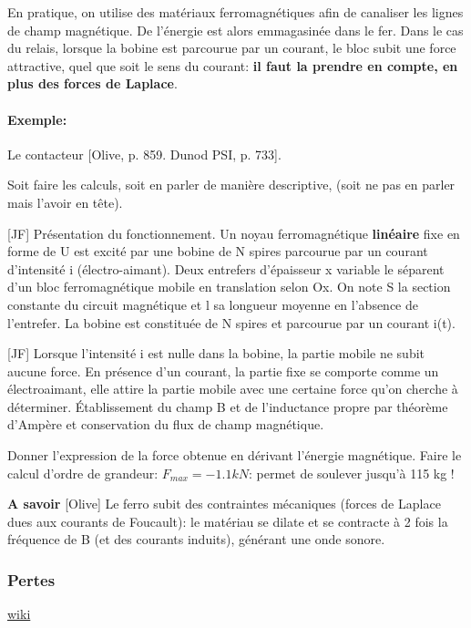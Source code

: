 \documentclass[11pt]{report}
\numberwithin{figure}{section}
\numberwithin{equation}{section}
\numberwithin{table}{section}
\newcommand{\1}{\boldsymbol{1}}
\begin{document}
En pratique, on utilise des matériaux ferromagnétiques afin de canaliser les lignes de champ magnétique. De l'énergie est alors emmagasinée dans le fer. Dans le cas du relais, lorsque la bobine est parcourue par un courant, le bloc subit une force attractive, quel que soit le sens du courant: \textbf{il faut la prendre en compte, en plus des forces de Laplace}.

\paragraph{Exemple:} Le contacteur [Olive, p. 859. Dunod PSI, p. 733].

Soit faire les calculs, soit en parler de manière descriptive, (soit ne pas en parler mais l'avoir en tête).

[JF] Présentation du fonctionnement. Un
noyau ferromagnétique \textbf{linéaire} fixe en forme de U est excité par une bobine de N spires parcourue par un courant d’intensité i (électro-aimant). Deux entrefers d’épaisseur x variable le séparent d’un bloc ferromagnétique mobile en translation
selon Ox. On note S la section constante du circuit magnétique et l sa longueur moyenne en l’absence de l’entrefer. La bobine est constituée de N spires et parcourue par un courant i(t).

[JF] Lorsque l’intensité i est nulle dans la bobine, la partie mobile ne subit
aucune force. En présence d’un courant, la partie fixe se comporte comme un électroaimant, elle attire la partie mobile
avec une certaine force qu’on cherche à déterminer. Établissement du champ B et de l’inductance propre par
théorème d’Ampère et conservation du flux de champ magnétique.

Donner l'expression de la force obtenue en dérivant l'énergie magnétique. Faire le calcul d'ordre de grandeur: $F_{max} = - 1.1 kN$: permet de soulever jusqu'à 115 kg !

\textbf{A savoir} [Olive] Le ferro subit des contraintes mécaniques (forces de Laplace dues aux courants de Foucault): le matériau se dilate et se contracte à 2 fois la fréquence de B (et des courants induits), générant une onde sonore. 


\subsubsection{Pertes}

\href{https://fr.wikipedia.org/wiki/Transformateur_%C3%A9lectrique#Les_pertes_de_puissance_d'un_transformateur}{wiki}
\end{document}
